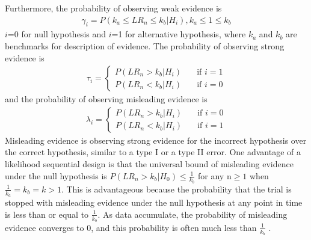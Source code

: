 \documentclass[12pt]{report}\usepackage[]{graphicx}\usepackage[]{color}
\newlength{\li}\setlength{\li}{14.48pt}
\newlength{\di}\setlength{\di}{-3.5mm}
\begin{document}
Furthermore, the probability of observing weak evidence is 
\begin{equation}
\begin{aligned}
\gamma_i = P(k_a \leq LR_n \leq k_b | H_i), k_a \leq 1 \leq k_b
\end{aligned}
\end{equation}
$i$=0 for null hypothesis and $i$=1 for alternative hypothesis, where $k_a$ and $k_b$ are benchmarks for description of evidence. The probability of observing strong evidence is 
\begin{equation}
\begin{aligned}
\tau_i = \left\{
        \begin{array}{ll}
            P(LR_n > k_b|H_i) & \quad \text{if } i = 1 \\
            P(LR_n < k_b|H_i) & \quad \text{if } i = 0
        \end{array}
    \right.
\end{aligned}
\end{equation}
and the probability of observing misleading evidence is 
\begin{equation}
\begin{aligned}
\lambda_i = \left\{
        \begin{array}{ll}
            P(LR_n > k_b|H_i) & \quad \text{if } i = 0 \\
            P(LR_n < k_b|H_i) & \quad \text{if } i = 1
        \end{array}
    \right.
\end{aligned}
\end{equation}
Misleading evidence is observing strong evidence for the incorrect hypothesis over the correct hypothesis, similar to a type I or a type II error. One advantage of a likelihood sequential design is that the universal bound of misleading evidence under the null hypothesis is $P(LR_n > k_b|H_0) \leq \frac{1}{k_b}$ for any $\mbox{n} \geq 1$ when $\frac{1}{k_a} = k_b = k > 1$. This is advantageous because the probability that the trial is stopped with misleading evidence under the null hypothesis at any point in time is less than or equal to $\frac{1}{k_b}$. As data accumulate, the probability of misleading evidence converges to 0, and this probability is often much less than $\frac{1}{k_b}$ \cite{BlumeNotes} \cite{Blume08}. \\
\end{document}
